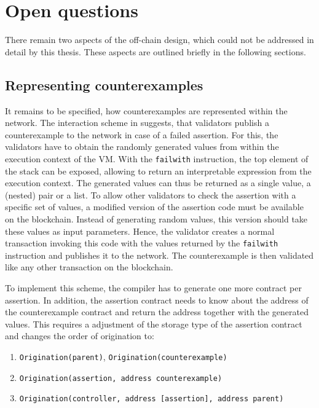 \section{Open questions}
There remain two aspects of the off-chain design, which could not be addressed in detail by this thesis. These aspects are outlined briefly in the following sections.

\subsection{Representing counterexamples}\label{sec:counterexample}
It remains to be specified, how counterexamples are represented within the network. The interaction scheme in  suggests, that validators publish a counterexample to the network in case of a failed assertion. For this, the validators have to obtain the randomly generated values from within the execution context of the VM. With the \texttt{failwith} instruction, the top element of the stack can be exposed, allowing to return an interpretable expression from the execution context. The generated values can thus be returned as a single value, a (nested) pair or a list. To allow other validators to check the assertion with a specific set of values, a modified version of the assertion code must be available on the blockchain. Instead of generating random values, this version should take these values as input parameters. Hence, the validator creates a normal transaction invoking this code with the values returned by the \texttt{failwith} instruction and publishes it to the network. The counterexample is then validated like any other transaction on the blockchain. 

To implement this scheme, the compiler has to generate one more contract per assertion. In addition, the assertion contract needs to know about the address of the counterexample contract and return the address together with the generated values. This requires a adjustment of the storage type of the assertion contract and changes the order of origination to:
\begin{enumerate}
\itemsep-0.5em
\item \texttt{Origination(parent)}, \texttt{Origination(counterexample)}
\item \texttt{Origination(assertion, address counterexample)}
\item \texttt{Origination(controller, address [assertion], address parent)} 
\end{enumerate}

